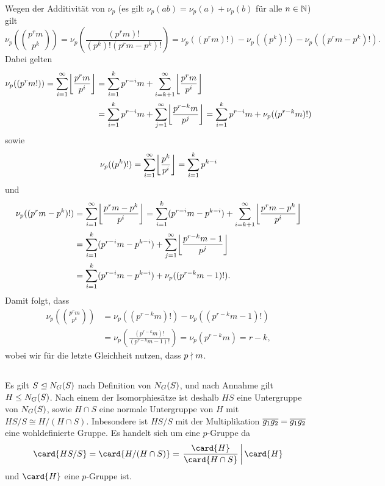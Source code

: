 Wegen der Additivität von $\nu_p$ (es gilt $\nu_p(ab) = \nu_p(a) + \nu_p(b)$ für alle $n \in \Natural$) gilt
\[
    \nu_p\left( \binom{p^r m}{p^k} \right)
  = \nu_p\left( \frac{(p^r m)!}{(p^k)! (p^r m - p^k)!} \right)
  = \nu_p((p^r m)!) - \nu_p((p^k)!) - \nu_p((p^r m - p^k)!).
\]
Dabei gelten
\begin{align*}
      \nu_p( (p^r m!) )
  =   \sum_{i=1}^\infty \floor*{ \frac{p^r m}{p^i} }
  &=  \sum_{i=1}^k p^{r-i} m + \sum_{i={k+1}}^\infty \floor*{ \frac{p^r m}{p^i} }
  \\
  &=  \sum_{i=1}^k p^{r-i} m + \sum_{j=1}^\infty \floor*{ \frac{p^{r-k} m}{p^j} }
   =  \sum_{i=1}^k p^{r-i} m + \nu_p( (p^{r-k} m)! )
\end{align*}
sowie
\[
    \nu_p( (p^k)! )
  = \sum_{i=1}^\infty \floor*{ \frac{p^k}{p^i} }
  = \sum_{i=1}^k p^{k-i}
\]
und
\begin{align*}
    \nu_p( (p^r m - p^k)! )
  &= \sum_{i=1}^\infty \floor*{ \frac{p^r m - p^k}{p^i} }
   = \sum_{i=1}^k (p^{r-i} m - p^{k-i}) + \sum_{i=k+1}^\infty \floor*{ \frac{p^r m - p^k}{p^i} }
  \\
  &= \sum_{i=1}^k (p^{r-i} m - p^{k-i}) + \sum_{j=1}^\infty \floor*{ \frac{p^{r-k} m - 1}{p^j} }
  \\
  &= \sum_{i=1}^k (p^{r-i} m - p^{k-i}) + \nu_p((p^{r-k} m - 1)!).
\end{align*}
Damit folgt, dass
\begin{align*}
      \nu_p\left( \binom{p^r m}{p^k} \right)
  &=  \nu_p( (p^{r-k} m)! ) - \nu_p( (p^{r-k} m - 1)! )
  \\
  &=  \nu_p\left( \frac{(p^{r-k} m)!}{(p^{r-k} m - 1)!} \right)
   =  \nu_p( p^{r-k} m )
   =  r-k,
\end{align*}
wobei wir für die letzte Gleichheit nutzen, dass $p \ndivides m$.










\subsection{}

Es gilt $S \nsubgroup \normalizer{S}{G}$ nach Definition von $\normalizer{S}{G}$, und nach Annahme gilt $H \subgroup \normalizer{S}{G}$.
Nach einem der Isomorphiesätze ist deshalb $HS$ eine Untergruppe von $\normalizer{S}{G}$, sowie $H \cap S$ eine normale Untergruppe von $H$ mit $HS/S \cong H/(H \cap S)$.
Inbesondere ist $HS/S$ mit der Multiplikation $\class{g_1} \class{g_2} = \class{g_1 g_2}$ eine wohldefinierte Gruppe.
Es handelt sich um eine $p$-Gruppe da
\[
                \card{ HS/S }
  =             \card{ H/(H \cap S) }
  = \left.      \frac{ \card{H} }{ \card{H \cap S} }
  \,\middle|\,  \card{H}
    \right.
\]
und $\card{H}$ eine $p$-Gruppe ist.






